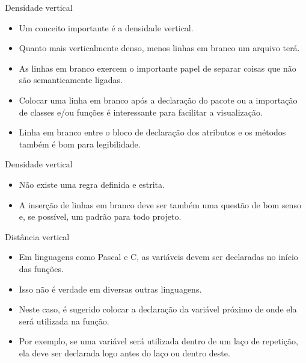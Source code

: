 \documentclass[11pt]{beamer}
\begin{document}
  \begin{frame}{Densidade vertical}
    \begin{itemize}
      \item Um conceito importante é a densidade vertical.
      \item Quanto mais verticalmente denso, menos linhas em branco um arquivo terá.
      \item As linhas em branco exercem o importante papel de separar coisas que não são semanticamente ligadas.
      \item Colocar uma linha em branco após a declaração do pacote ou a importação de classes e/ou funções é interessante para facilitar a visualização.
      \item Linha em branco entre o bloco de declaração dos atributos e os métodos também é bom para legibilidade. 
    \end{itemize}
  \end{frame}

  \begin{frame}{Densidade vertical}
    \begin{itemize}
      \item Não existe uma regra definida e estrita.
      \item A inserção de linhas em branco deve ser também uma questão de bom senso e, se possível, um padrão para todo projeto.
    \end{itemize}
  \end{frame}

  \begin{frame}{Distância vertical}
    \begin{itemize}
      \item Em linguagens como Pascal e C, as variáveis devem ser declaradas no início das funções.
      \item Isso não é verdade em diversas outras linguagens.
      \item Neste caso, é sugerido colocar a declaração da variável próximo de onde ela será utilizada na função.
      \item Por exemplo, se uma variável será utilizada dentro de um laço de repetição, ela deve ser declarada logo antes do laço ou dentro deste.
    \end{itemize}
  \end{frame}
\end{document}
